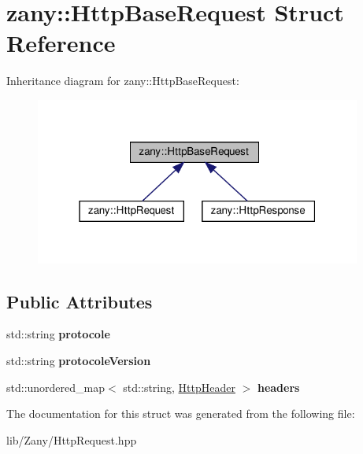 \hypertarget{structzany_1_1_http_base_request}{}\section{zany\+:\+:Http\+Base\+Request Struct Reference}
\label{structzany_1_1_http_base_request}


Inheritance diagram for zany\+:\+:Http\+Base\+Request\+:
\nopagebreak
\begin{figure}[H]
\begin{center}
\leavevmode
\includegraphics[width=304pt]{structzany_1_1_http_base_request__inherit__graph}
\end{center}
\end{figure}
\subsection*{Public Attributes}
\begin{DoxyCompactItemize}
\item 
\mbox{\label{structzany_1_1_http_base_request_affa32927927540a9565e400ce6283df2}} 
std\+::string {\bfseries protocole}
\item 
\mbox{\label{structzany_1_1_http_base_request_a7e4dcd0cb2e518b7bd12ce22637c0924}} 
std\+::string {\bfseries protocole\+Version}
\item 
\mbox{\label{structzany_1_1_http_base_request_a27df614fc8d685efed2489c74bf423e1}} 
std\+::unordered\+\_\+map$<$ std\+::string, \hyperlink{classzany_1_1_http_header}{Http\+Header} $>$ {\bfseries headers}
\end{DoxyCompactItemize}


The documentation for this struct was generated from the following file\+:\begin{DoxyCompactItemize}
\item 
lib/\+Zany/Http\+Request.\+hpp\end{DoxyCompactItemize}
